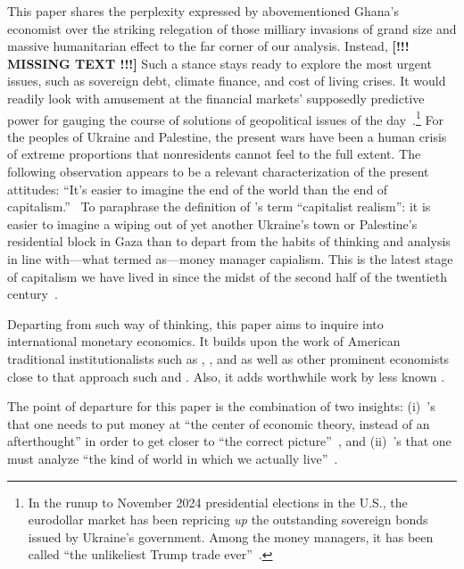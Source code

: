 This paper shares the perplexity expressed by abovementioned Ghana's economist over the striking relegation of those milliary invasions of grand size and massive humanitarian effect to the far corner of our analysis. Instead, \textbf{[!!! MISSING TEXT !!!]} Such a stance stays ready to explore the most urgent issues, such as sovereign debt, climate finance, and cost of living crises. It would readily look with amusement at the financial markets' supposedly predictive power for gauging the course of solutions of geopolitical issues of the day~\citep{ft2024,tooze2024a}.\footnote{In the runup to November 2024 presidential elections in the U.S., the eurodollar market has been repricing \textit{up} the outstanding sovereign bonds issued by Ukraine's government. Among the money managers, it has been called ``the unlikeliest Trump trade ever''~\citep{ft2024}.} For the peoples of Ukraine and Palestine, the present wars have been a human crisis of extreme proportions that nonresidents cannot feel to the full extent. The following observation appears to be a relevant characterization of the present attitudes: ``It's easier to imagine the end of the world than the end of capitalism.''~\citep{fisher2022} To paraphrase the definition of \citeauthor{fisher2022}'s term ``capitalist realism'': it is easier to imagine a wiping out of yet another Ukraine's town or Palestine's residential block in Gaza than to depart from the habits of thinking and analysis in line with---what \cite{minsky1986} termed as---money manager capialism. This is the latest stage of capitalism we have lived in since the midst of the second half of the twentieth century~\citep{tymoigne2014}.   

Departing from such way of thinking, this paper aims to inquire into international monetary economics. It builds upon the work of American traditional institutionalists such as \citeauthor{veblen1904}, \citeauthor{commons1923}, and \citeauthor{dillard1987} as well as other prominent economists close to that approach such \citeauthor{keynes1936} and \citeauthor{minsky1986}. Also, it adds worthwhile work by less known \citeauthor{innes1913}. 

The point of departure for this paper is the combination of two insights: (i)~\citeauthor{commons1923}'s that one needs to put money at ``the center of economic theory, instead of an afterthought'' in order to get closer to ``the correct picture''~\citep[pp.~644,646]{commons1923}, and (ii)~\citeauthor{dillard1987}'s that one must analyze ``the kind of world in which we actually live''~\citep[p.~1623]{dillard1987}. 

